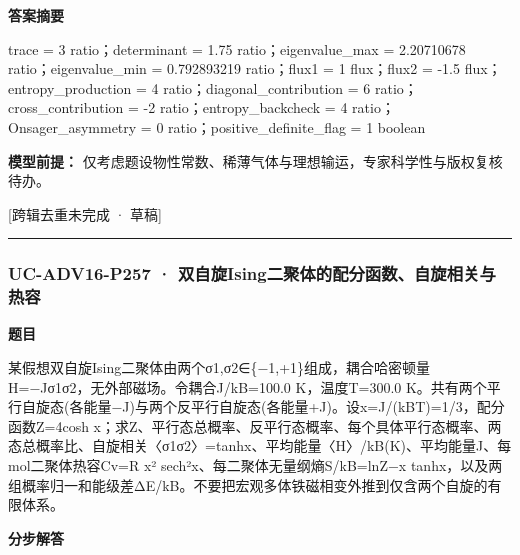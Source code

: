 \documentclass[UTF8,11pt,a4paper]{ctexart}
\begin{document}
\noindent\textbf{答案摘要}\par
trace = 3 ratio；determinant = 1.75 ratio；eigenvalue\_max = 2.20710678 ratio；eigenvalue\_min = 0.792893219 ratio；flux1 = 1 flux；flux2 = -1.5 flux；entropy\_production = 4 ratio；diagonal\_contribution = 6 ratio；cross\_contribution = -2 ratio；entropy\_backcheck = 4 ratio；Onsager\_asymmetry = 0 ratio；positive\_definite\_flag = 1 boolean\par
\noindent\textbf{模型前提：}
仅考虑题设物性常数、稀薄气体与理想输运，专家科学性与版权复核待办。\par
\noindent\textcolor{red!65!black}{[跨辑去重未完成 · 草稿]} \par
\medskip\hrule\medskip
{}
\subsubsection*{UC-ADV16-P257 · 双自旋Ising二聚体的配分函数、自旋相关与热容}
\noindent\textbf{题目}\par
某假想双自旋Ising二聚体由两个σ1,σ2∈\{−1,+1\}组成，耦合哈密顿量H=−Jσ1σ2，无外部磁场。令耦合J/kB=100.0 K，温度T=300.0 K。共有两个平行自旋态(各能量−J)与两个反平行自旋态(各能量+J)。设x=J/(kBT)=1/3，配分函数Z=4cosh x；求Z、平行态总概率、反平行态概率、每个具体平行态概率、两态总概率比、自旋相关〈σ1σ2〉=tanhx、平均能量〈H〉/kB(K)、平均能量J、每mol二聚体热容Cv=R x² sech²x、每二聚体无量纲熵S/kB=lnZ−x tanhx，以及两组概率归一和能级差ΔE/kB。不要把宏观多体铁磁相变外推到仅含两个自旋的有限体系。\par
\medskip\noindent\textbf{分步解答}
\end{document}
